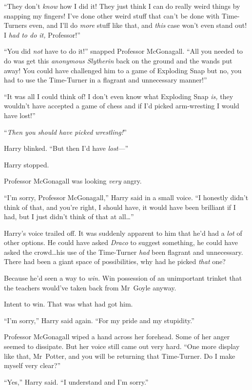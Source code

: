 “They don’t \emph{know} how I did it! They just think I can do really weird things by snapping my fingers! I’ve done other weird stuff that can’t be done with Time-Turners even, and I’ll do \emph{more} stuff like that, and \emph{this} case won’t even stand out! I \emph{had to do it,} Professor!”

“You did \emph{not} have to do it!” snapped Professor McGonagall. “All you needed to do was get this \emph{anonymous Slytherin} back on the ground and the wands put away! You could have challenged him to a game of Exploding Snap but no, you had to use the Time-Turner in a flagrant and unnecessary manner!”

“It was all I could think of! I don’t even know what Exploding Snap \emph{is,} they wouldn’t have accepted a game of chess and if I’d picked arm-wresting I would have lost!”

“\emph{Then you should have picked wrestling!}”

Harry blinked. “But then I’d have \emph{lost}—”

Harry stopped.

Professor McGonagall was looking \emph{very} angry.

“I’m sorry, Professor McGonagall,” Harry said in a small voice. “I honestly didn’t think of that, and you’re right, I should have, it would have been brilliant if I had, but I just didn’t think of that at all…”

Harry’s voice trailed off. It was suddenly apparent to him that he’d had a \emph{lot} of other options. He could have asked \emph{Draco} to suggest something, he could have asked the crowd…his use of the Time-Turner \emph{had} been flagrant and unnecessary. There had been a giant space of possibilities, why had he picked \emph{that} one?

Because he’d seen a way to \emph{win.} Win possession of an unimportant trinket that the teachers would’ve taken back from Mr~Goyle anyway.

Intent to win. That was what had got him.

“I’m sorry,” Harry said again. “For my pride and my stupidity.”

Professor McGonagall wiped a hand across her forehead. Some of her anger seemed to dissipate. But her voice still came out very hard. “One more display like that, Mr~Potter, and you will be returning that Time-Turner. Do I make myself very clear?”

“Yes,” Harry said. “I understand and I’m sorry.”

